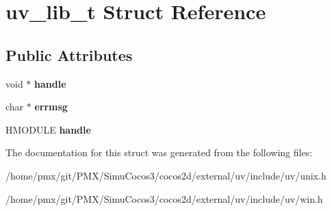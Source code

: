 \hypertarget{structuv__lib__t}{}\section{uv\+\_\+lib\+\_\+t Struct Reference}
\label{structuv__lib__t}
\subsection*{Public Attributes}
\begin{DoxyCompactItemize}
\item 
\mbox{\label{structuv__lib__t_a324a35f16aeed41ee8f1ce1604998206}} 
void $\ast$ {\bfseries handle}
\item 
\mbox{\label{structuv__lib__t_a098655badc5308af959cdac4c2809340}} 
char $\ast$ {\bfseries errmsg}
\item 
\mbox{\label{structuv__lib__t_ac9404effab57460e2bd51b054d31aede}} 
H\+M\+O\+D\+U\+LE {\bfseries handle}
\end{DoxyCompactItemize}


The documentation for this struct was generated from the following files\+:\begin{DoxyCompactItemize}
\item 
/home/pmx/git/\+P\+M\+X/\+Simu\+Cocos3/cocos2d/external/uv/include/uv/unix.\+h\item 
/home/pmx/git/\+P\+M\+X/\+Simu\+Cocos3/cocos2d/external/uv/include/uv/win.\+h\end{DoxyCompactItemize}
